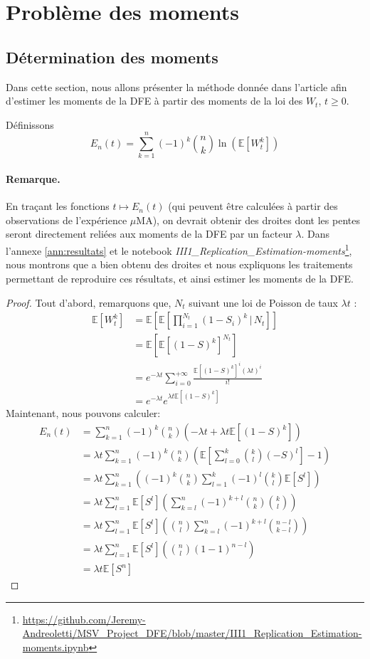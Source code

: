 \documentclass[12pt]{article}
\newtheorem{plain}{Proposition}[section]
\newcounter{prop}[section]
\newcommand{\req}[1]{\paragraph{Remarque.}#1\vspace{0.1cm}}
\newcommand{\prop}[1]{\begin{center}\fbox{\begin{minipage}{.8\linewidth}\begin{plain} #1\end{plain}\end{minipage}}\end{center}}
\newcommand{\pth}[1]{\left(#1\right)}
\newcommand{\cro}[1]{\left[#1\right]}
\newcommand{\En}{\mathbb{N}}
\newcommand{\Esp}[1]{\mathbb{E}\cro{#1}}
\newcommand{\kt }{\,|\,}
\begin{document}
\FloatBarrier
\section{Problème des moments}

\subsection{Détermination des moments}\label{ss:det_mom}

Dans cette section, nous allons présenter la méthode donnée dans l'article afin d'estimer les moments de la DFE à partir des moments de la loi des $W_t$, $t\geqslant 0$.

Définissons \[E_n(t)=\sum_{k=1}^n(-1)^k\binom{n}{k}\ln\pth{\Esp{W_t^k}}\]

\prop{Pour $t\geqslant 0$ et $n\in\En$: \[E_n(t)=\pth{\lambda\Esp{S^n}}t\]}

\req{En traçant les fonctions $t\mapsto E_n(t)$ (qui peuvent être calculées à partir des observations de l'expérience $\mu$MA), on devrait obtenir des droites dont les pentes seront directement reliées aux moments de la DFE par un facteur $\lambda$. Dans l'annexe \ref{ann:resultats} et le notebook \emph{III1\_Replication\_Estimation-moments}\footnote{\url{https://github.com/Jeremy-Andreoletti/MSV_Project_DFE/blob/master/III1_Replication_Estimation-moments.ipynb}}, nous montrons que \cite{rob} a bien obtenu des droites et nous expliquons les traitements permettant de reproduire ces résultats, et ainsi estimer les moments de la DFE.}

\begin{proof}
  Tout d'abord, remarquons que, $N_t$ suivant une loi de Poisson de taux $\lambda t$ :
  \begin{align*}
    \Esp{W_t^k}&=\Esp{\Esp{\prod_{i=1}^{N_t}(1-S_i)^k\kt N_t}}\\
    &=\Esp{\Esp{(1-S)^k}^{N_t}}\\
    &=e^{-\lambda t}\sum_{i=0}^{+\infty}\frac{\Esp{(1-S)^k}^i(\lambda t)^i}{i!}\\
    &=e^{-\lambda t}e^{\lambda t\Esp{(1-S)^k}}
  \end{align*}
  Maintenant, nous pouvons calculer:
  \begin{align*}
    E_n(t)&=\sum_{k=1}^n(-1)^k\binom{n}{k}\pth{-\lambda t+\lambda t\Esp{(1-S)^k}}\\
    &=\lambda t\sum_{k=1}^n(-1)^k\binom{n}{k}\pth{\Esp{\sum_{l=0}^k\binom{k}{l}\pth{-S}^l}-1}\\
    &=\lambda t\sum_{k=1}^n\pth{(-1)^k\binom{n}{k}\sum_{l=1}^k(-1)^l\binom{k}{l}\Esp{S^l}}\\
    &=\lambda t\sum_{l=1}^n\Esp{S^l}\pth{\sum_{k=l}^n(-1)^{k+l}\binom{n}{k}\binom{k}{l}}\\
    &=\lambda t\sum_{l=1}^n\Esp{S^l}\pth{\binom{n}{l}\sum_{k=l}^n(-1)^{k+l}\binom{n-l}{k-l}}\\
    &=\lambda t\sum_{l=1}^n\Esp{S^l}\pth{\binom{n}{l}(1-1)^{n-l}}\\
    &=\lambda t\Esp{S^n}
  \end{align*}
\end{proof}
\end{document}
